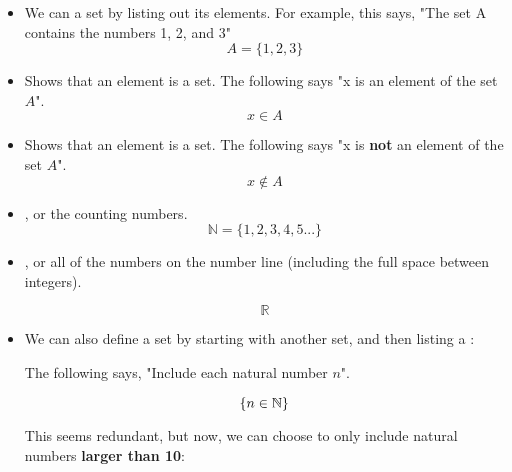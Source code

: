     
    \begin{itemize}
        \item We can  a set by listing out its elements. For example, this says, "The set A contains the numbers 1, 2, and 3"
            \begin{equation}
                A = \{1, 2, 3\}
            \end{equation}
            
            
            
        \item Shows that an element is  a set. The following says "x is an element of the set $A$".
            \begin{equation}
                x \in A
            \end{equation}
            
        \item Shows that an element is  a set. The following says "x is \textbf{not} an element of the set $A$".
            \begin{equation}
                x \notin A
            \end{equation}
            
        \item {}, or the counting numbers. 
            \begin{equation}
                \mathbb{N} = \{ 1, 2, 3, 4, 5... \}
            \end{equation}
            
        \item {}, or all of the numbers on the number line (including the full space between integers).
        
            \begin{equation}
                \mathbb{R}
            \end{equation}
            
        \item We can also define a set by starting with another set, and then listing a :
        
            The following says, "Include each natural number $n$".
            
            \begin{equation}
                \{ n \in \mathbb{N} \}
            \end{equation}
            
            This seems redundant, but now, we can choose to only include natural numbers \textbf{larger than 10}:
            

\end{itemize}

